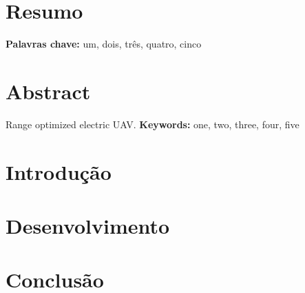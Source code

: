 \documentclass[12pt,a4paper,oneside,openany]{book}
\providecommand{\keywords}[1]{\textbf{Keywords:} #1}
\providecommand{\keywordsP}[1]{\textbf{Palavras chave:} #1}
\begin{document}
\begin{sloppy}
\chapter*{Resumo}

\keywordsP{um, dois, três, quatro, cinco}

%
%
\newpage
\thispagestyle{plain}
\chapter*{Abstract}
Range optimized electric UAV.
\keywords{one, two, three, four, five}

%
%
\newpage
\thispagestyle{plain}
\renewcommand{\contentsname}{Índice}
\tableofcontents
\newpage
\thispagestyle{plain}
\listoffigures
\newpage
\thispagestyle{plain}
\listoftables

\mainmatter
\pagestyle{plain}
%
%
\newpage
\chapter{Introdução\label{ch:intro}}



%
%
\newpage
\chapter{Desenvolvimento \label{ch:desenvolvimento}}



%
%
\newpage
\chapter{Conclusão \label{ch:conclusao}}



%
% 
%
\printbibliography

\end{sloppy}
\end{document}
